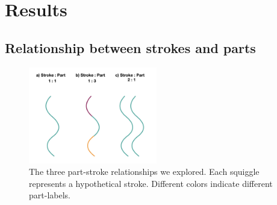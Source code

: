 \documentclass[10pt,letterpaper]{article}
\begin{document}
\section{Results}

\subsection{Relationship between strokes and parts}

\begin{figure}[htbp]
\centering
\includegraphics[width=0.5\textwidth]{figures/Part-Stroke.jpeg}
\caption{The three part-stroke relationships we explored. Each squiggle represents a hypothetical stroke. Different colors indicate different part-labels.}
\end{figure}
\end{document}
